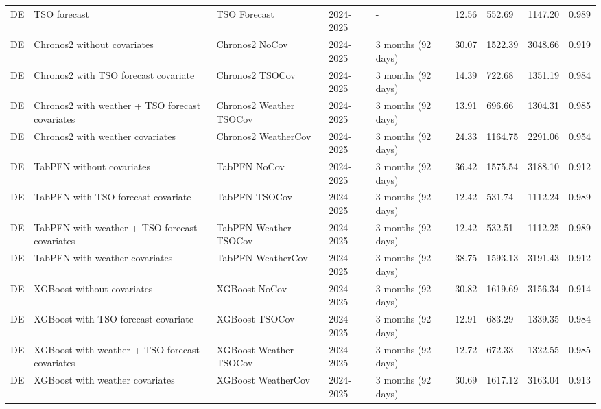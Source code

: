 \begin{longtable}{lllllllll}
DE & TSO forecast & TSO Forecast & 2024-2025 & - & 12.56 & 552.69 & 1147.20 & 0.989 \\
DE & Chronos2 without covariates & Chronos2 NoCov & 2024-2025 & 3 months (92 days) & 30.07 & 1522.39 & 3048.66 & 0.919 \\
DE & Chronos2 with TSO forecast covariate & Chronos2 TSOCov & 2024-2025 & 3 months (92 days) & 14.39 & 722.68 & 1351.19 & 0.984 \\
DE & Chronos2 with weather + TSO forecast covariates & Chronos2 Weather TSOCov & 2024-2025 & 3 months (92 days) & 13.91 & 696.66 & 1304.31 & 0.985 \\
DE & Chronos2 with weather covariates & Chronos2 WeatherCov & 2024-2025 & 3 months (92 days) & 24.33 & 1164.75 & 2291.06 & 0.954 \\
DE & TabPFN without covariates & TabPFN NoCov & 2024-2025 & 3 months (92 days) & 36.42 & 1575.54 & 3188.10 & 0.912 \\
DE & TabPFN with TSO forecast covariate & TabPFN TSOCov & 2024-2025 & 3 months (92 days) & 12.42 & 531.74 & 1112.24 & 0.989 \\
DE & TabPFN with weather + TSO forecast covariates & TabPFN Weather TSOCov & 2024-2025 & 3 months (92 days) & 12.42 & 532.51 & 1112.25 & 0.989 \\
DE & TabPFN with weather covariates & TabPFN WeatherCov & 2024-2025 & 3 months (92 days) & 38.75 & 1593.13 & 3191.43 & 0.912 \\
DE & XGBoost without covariates & XGBoost NoCov & 2024-2025 & 3 months (92 days) & 30.82 & 1619.69 & 3156.34 & 0.914 \\
DE & XGBoost with TSO forecast covariate & XGBoost TSOCov & 2024-2025 & 3 months (92 days) & 12.91 & 683.29 & 1339.35 & 0.984 \\
DE & XGBoost with weather + TSO forecast covariates & XGBoost Weather TSOCov & 2024-2025 & 3 months (92 days) & 12.72 & 672.33 & 1322.55 & 0.985 \\
DE & XGBoost with weather covariates & XGBoost WeatherCov & 2024-2025 & 3 months (92 days) & 30.69 & 1617.12 & 3163.04 & 0.913 \\
\end{longtable}
